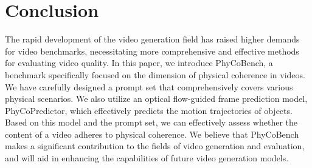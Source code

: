 \section{Conclusion}

The rapid development of the video generation field has raised higher demands for video benchmarks, necessitating more comprehensive and effective methods for evaluating video quality. In this paper, we introduce PhyCoBench, a benchmark specifically focused on the dimension of physical coherence in videos. We have carefully designed a prompt set that comprehensively covers various physical scenarios. We also utilize an optical flow-guided frame prediction model, PhyCoPredictor, which effectively predicts the motion trajectories of objects. Based on this model and the prompt set, we can effectively assess whether the content of a video adheres to physical coherence. We believe that PhyCoBench makes a significant contribution to the fields of video generation and evaluation, and will aid in enhancing the capabilities of future video generation models.

